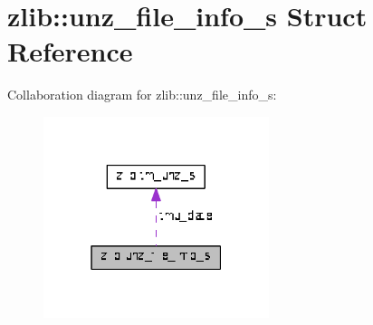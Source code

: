 \hypertarget{structzlib_1_1unz__file__info__s}{}\section{zlib\+:\+:unz\+\_\+file\+\_\+info\+\_\+s Struct Reference}
\label{structzlib_1_1unz__file__info__s}


Collaboration diagram for zlib\+:\+:unz\+\_\+file\+\_\+info\+\_\+s\+:\nopagebreak
\begin{figure}[H]
\begin{center}
\leavevmode
\includegraphics[width=187pt]{structzlib_1_1unz__file__info__s__coll__graph}
\end{center}
\end{figure}
